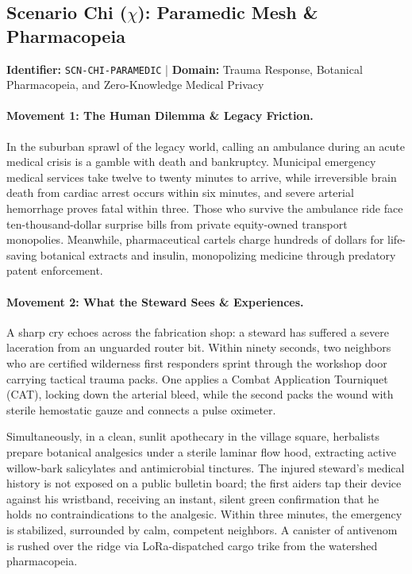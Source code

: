 \subsection{Scenario Chi (\texorpdfstring{$\chi$}{Chi}): Paramedic Mesh \& Pharmacopeia}
\label{subsec:scn_chi}
\textbf{Identifier:} \texttt{SCN-CHI-PARAMEDIC} \quad | \quad \textbf{Domain:} Trauma Response, Botanical Pharmacopeia, and Zero-Knowledge Medical Privacy

\paragraph{Movement 1: The Human Dilemma \& Legacy Friction.}
In the suburban sprawl of the legacy world, calling an ambulance during an acute medical crisis is a gamble with death and bankruptcy. Municipal emergency medical services take twelve to twenty minutes to arrive, while irreversible brain death from cardiac arrest occurs within six minutes, and severe arterial hemorrhage proves fatal within three. Those who survive the ambulance ride face ten-thousand-dollar surprise bills from private equity-owned transport monopolies. Meanwhile, pharmaceutical cartels charge hundreds of dollars for life-saving botanical extracts and insulin, monopolizing medicine through predatory patent enforcement.

\paragraph{Movement 2: What the Steward Sees \& Experiences.}
A sharp cry echoes across the fabrication shop: a steward has suffered a severe laceration from an unguarded router bit. Within ninety seconds, two neighbors who are certified wilderness first responders sprint through the workshop door carrying tactical trauma packs. One applies a Combat Application Tourniquet (CAT), locking down the arterial bleed, while the second packs the wound with sterile hemostatic gauze and connects a pulse oximeter. 

Simultaneously, in a clean, sunlit apothecary in the village square, herbalists prepare botanical analgesics under a sterile laminar flow hood, extracting active willow-bark salicylates and antimicrobial tinctures. The injured steward's medical history is not exposed on a public bulletin board; the first aiders tap their device against his wristband, receiving an instant, silent green confirmation that he holds no contraindications to the analgesic. Within three minutes, the emergency is stabilized, surrounded by calm, competent neighbors. A canister of antivenom is rushed over the ridge via LoRa-dispatched cargo trike from the watershed pharmacopeia.

